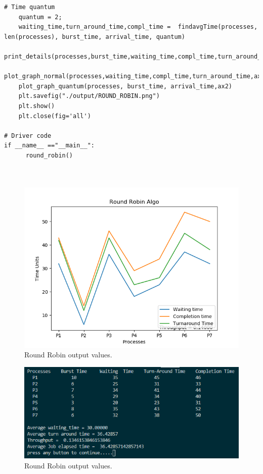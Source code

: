 \documentclass[11pt,a4paper]{report}
\begin{document}
\begin{lstlisting}[columns=fullflexible,caption = Round Robin Source Code,breaklines=true,postbreak=\mbox{\textcolor{red}{$\hookrightarrow$}\space},]
    # Time quantum  
    quantum = 2;  
    waiting_time,turn_around_time,compl_time =  findavgTime(processes, len(processes), burst_time, arrival_time, quantum) 
    print_details(processes,burst_time,waiting_time,compl_time,turn_around_time)
    plot_graph_normal(processes,waiting_time,compl_time,turn_around_time,ax1)
    plot_graph_quantum(processes, burst_time, arrival_time,ax2)
    plt.savefig("./output/ROUND_ROBIN.png")
    plt.show()
    plt.close(fig='all')

# Driver code  
if __name__ =="__main__": 
      round_robin()

  
\end{lstlisting}
\begin{figure}[H]
	\centering
	\includegraphics[scale=0.8]{./img/ROUND_ROBIN_output.png}
	\caption{Round Robin output values.}
\end{figure}

\begin{figure}[H]

	\includegraphics[scale=0.9]{./img/rr_out.PNG}
	\caption{Round Robin output values.}
\end{figure}
\end{document}
